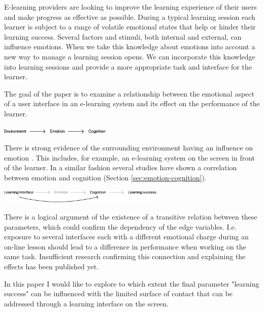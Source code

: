 E-learning providers are looking to improve the learning experience of their users and make progress as effective as possible. 
During a typical learning session each learner is subject to a range of volatile emotional states that help or hinder their learning success. 
Several factors and stimuli, both internal and external, can influence emotions. 
When we take this knowledge about emotions into account a new way to manage a learning session opens. We can incorporate this knowledge into learning sessions and provide a more appropriate task and interface for the learner.

The goal of the paper is to examine a relationship between the emotional aspect of a user interface in an e-learning system and its effect on the performance of the learner.


\begin{center}
	\includegraphics[width=200px]{graphics/relation1.png}
\end{center}
 
There is strong evidence of the surrounding environment having an influence on emotion \cite{Johnson2000, Arockiam2013, Bertamini2013}. This includes, for example, an e-learning system on the screen in front of the learner. In a similar fashion several studies have shown a correlation between emotion and cognition (Section \ref{sec:emotion-cognition}).

\begin{center}
\includegraphics[width=300px]{graphics/relation2.png}
\end{center}

There is a logical argument of the existence of a transitive relation between these parameters, which could confirm the dependency of the edge variables. 
I.e. exposure to several interfaces each with a different emotional charge during an on-line lesson should lead to a difference in performance when working on the same task.
Insufficient research confirming this connection and explaining the effects has been published yet. 

In this paper I would like to explore to which extent the final parameter "learning success" can be influenced with the limited surface of contact that can be addressed through a learning interface on the screen.